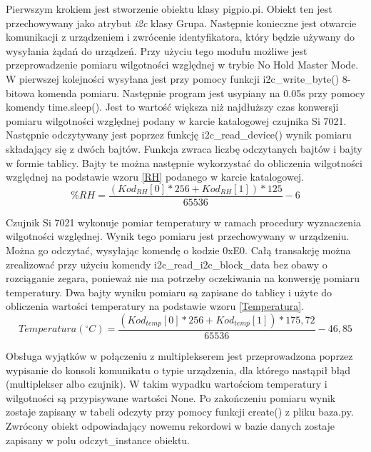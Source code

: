 \documentclass[a4paper,12pt,twoside]{article}
\begin{document}
Pierwszym krokiem jest stworzenie obiektu klasy pigpio.pi. Obiekt ten jest przechowywany jako atrybut \textit{i2c} klasy Grupa. Następnie konieczne jest otwarcie komunikacji z urządzeniem i zwrócenie identyfikatora, który będzie używany do wysyłania żądań do urządzeń. Przy użyciu tego modułu możliwe jest przeprowadzenie pomiaru wilgotności względnej w trybie No Hold Master Mode. W pierwszej kolejności wysyłana jest przy pomocy funkcji i2c{\_}write{\_}byte() 8-bitowa komenda pomiaru. Następnie program jest usypiany na 0.05s przy pomocy komendy time.sleep(). Jest to wartość większa niż najdłuższy czas konwersji pomiaru wilgotności względnej podany w karcie katalogowej czujnika Si 7021. Następnie odczytywany jest poprzez funkcję i2c{\_}read{\_}device() wynik pomiaru składający się z dwóch bajtów. Funkcja zwraca liczbę odczytanych bajtów i bajty w formie tablicy. Bajty te można następnie wykorzystać do obliczenia wilgotności względnej na podstawie wzoru \ref{RH} podanego w karcie katalogowej.
\begin{equation} \label{RH}
\%RH = \frac{(Kod_{RH}[0] * 256 + Kod_{RH}[1]) * 125}{65536} - 6  
\end{equation}

Czujnik Si 7021 wykonuje pomiar temperatury w ramach procedury wyznaczenia wilgotności względnej. Wynik tego pomiaru jest przechowywany w urządzeniu. Można go odczytać, wysyłając komendę o kodzie 0xE0. Całą transakcję można zrealizować przy użyciu komendy i2c{\_}read{\_}i2c{\_}block{\_}data bez obawy o rozciąganie zegara, ponieważ nie ma potrzeby oczekiwania na konwersję pomiaru temperatury. Dwa bajty wyniku pomiaru są zapisane do tablicy i użyte do obliczenia wartości temperatury na podstawie wzoru \ref{Temperatura}.
\begin{equation} \label{Temperatura}
Temperatura ({^\circ}C) = \frac{(Kod_{temp}[0] * 256 + Kod_{temp}[1]) * 175,72}{65536} - 46,85  
\end{equation}

Obsługa wyjątków w połączeniu z multiplekserem jest przeprowadzona poprzez wypisanie do konsoli komunikatu o typie urządzenia, dla którego nastąpił błąd (multiplekser albo czujnik). W takim wypadku wartościom temperatury i wilgotności są przypisywane wartości None. Po zakończeniu pomiaru wynik zostaje zapisany w tabeli odczyty przy pomocy funkcji create() z pliku baza.py. Zwrócony obiekt odpowiadający nowemu rekordowi w bazie danych zostaje zapisany w polu odczyt{\_}instance obiektu.
\end{document}
